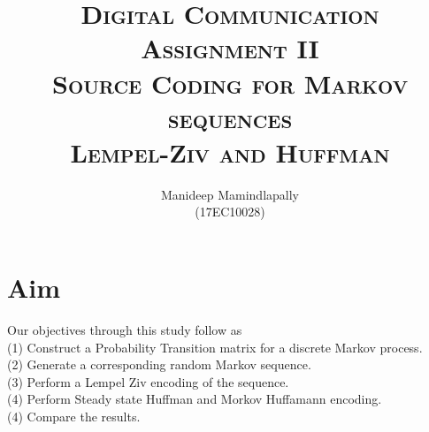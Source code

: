 \documentclass[a4paper,10pt]{article}
\begin{document}
%
   \title{{ 
   \textsc{Digital Communication} } \\
   \textsc{Assignment II} \\
   \Large{\textsc{Source Coding for Markov sequences \\ Lempel-Ziv and Huffman}}}

   \author{ 
   	Manideep Mamindlapally
   	\\ (17EC10028)}
          
   \date{}
   \maketitle
    
\section*{Aim}
Our objectives through this study follow as \\
(1) Construct a Probability Transition matrix for a discrete Markov process. \\
(2) Generate a corresponding random Markov sequence. \\
(3) Perform a Lempel Ziv encoding of the sequence. \\
(4) Perform Steady state Huffman and Morkov Huffamann encoding.\\
(4) Compare the results.
\end{document}

